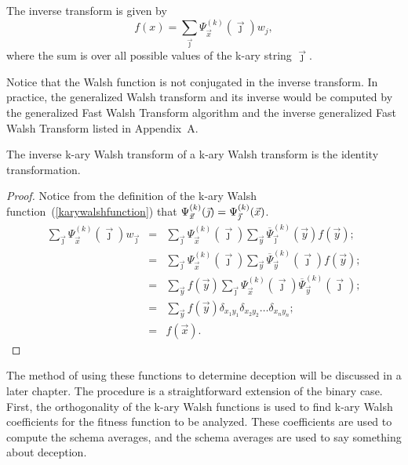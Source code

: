 \begin{definition}
The inverse transform is given by
\begin{equation}
f(x)=\sum_{\vec\jmath}{\Psi^{(k)}_{\vec x}(\vec \jmath) w_j},	\label{inverse}
\end{equation}
where the sum is over all possible values of the k-ary string $\vec\jmath$.
\end{definition}
Notice that the Walsh function is not conjugated in the inverse transform.
In practice, the generalized Walsh transform and its inverse would be
computed by the generalized Fast Walsh Transform algorithm and the inverse
generalized Fast Walsh Transform listed in Appendix~A.

\begin{theorem}
The inverse k-ary Walsh transform of a k-ary Walsh transform is the
identity transformation.
\end{theorem}

\begin{proof}
Notice from the definition of the k-ary Walsh function~(\ref{karywalshfunction})
that $\Psi^{(k)}_{\vec x}(\vec\jmath)=\mbox{$\Psi_{\vec{\jmath}}^{(k)}(\vec{x})$}$.
\begin{eqnarray}
\sum_{\vec{\jmath}}{\Psi_{\vec{x}}^{(k)}(\vec{\jmath}) w_{\vec{\jmath}}}
&=& \sum_{\vec{\jmath}}{\Psi_{\vec{x}}^{(k)}(\vec{\jmath}) \sum_{\vec{y}}{\overline{\Psi}^{(k)}_{\vec{\jmath}}(\vec{y}) f(\vec{y})}}; \nonumber \\
&=& \sum_{\vec{\jmath}}{\Psi^{(k)}_{\vec{x}}(\vec{\jmath}) \sum_{\vec{y}}{\overline{\Psi}^{(k)}_{\vec{y}}(\vec{\jmath}) f(\vec{y})}}; \nonumber \\
&=& \sum_{\vec{y}}{f(\vec{y}) \sum_{\vec{\jmath}} {\Psi^{(k)}_{\vec{x}}(\vec{\jmath}) \overline{\Psi}^{(k)}_{\vec{y}}(\vec{\jmath})}}; \nonumber \\
&=& \sum_{\vec{y}}{f(\vec{y}) \delta_{x_1y_1}\delta_{x_2 y_2}\ldots\delta_{x_n y_n}};\nonumber \\
&=& f(\vec{x}).
\end{eqnarray}
\end{proof}

The method of using these functions to determine deception will be
discussed in a later chapter.
The procedure is a straightforward extension of
the binary case.  First, the orthogonality of the k-ary Walsh
functions is used to find k-ary Walsh coefficients for the fitness function
to be analyzed.
These coefficients are used to compute the schema averages, and
the schema averages are used to say something about deception.

